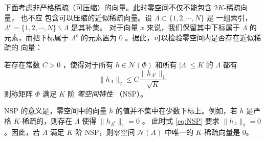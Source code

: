 下面考虑非严格稀疏（可压缩）的向量。此时零空间不仅不能包含 $2K$-稀疏向量，
也不应
包含可以压缩的近似稀疏向量。设 $\Lambda \subset \{1, 2, \cdots, N\}$ 是
一组索引， $\Lambda^c = \{1,2,\cdots,N\} \backslash \Lambda$ 是其补集。
对于向量 $x$ 来说，我们保留其中下标属于 $\Lambda$ 的元素，而把下标属于
$\Lambda^c$ 的元素置为 $0$ 。据此，可以检验零空间内是否存在近似稀疏的
向量：
\begin{definition}[$K$ 阶零空间特性]
若存在常数 $C > 0$ ，使得对于所有 $h \in \mathcal{N}(\Phi)$ 和所有
$|\Lambda| \leq K$ 的 $\Lambda$ 都有
\begin{equation} \label{eq:NSP}
\|h_\Lambda\|_2 \leq C \frac{\|h_{\Lambda^c}\|_1}{\sqrt{K}}
\end{equation}
则称矩阵 $\Phi$ 满足 $K$ 阶 \emph{零空间特性} （NSP）。
\end{definition}
NSP 的意义是，零空间中的向量 $h$ 的值并不集中在少数下标上。例如，若 $h$
是严格 $K$-稀疏的，则存在 $\Lambda$ 使得 $\|h_{\Lambda^c}\|_1 = 0$ 。
此时式 \ref{eq:NSP} 要求 $\|h_\Lambda\|_2 = 0$。因此，若 $A$ 满足 $K$
阶 NSP，则零空间 $\mathcal{N}(A)$ 中唯一的 $K$-稀疏向量是 $0$。

% 

